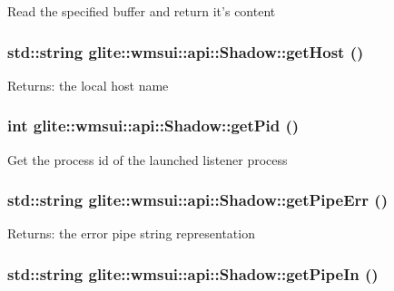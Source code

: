 Read the specified buffer and return it's content \hypertarget{classglite_1_1wmsui_1_1api_1_1Shadow_e0}{
\subsubsection[getHost]{\setlength{\rightskip}{0pt plus 5cm}std::string glite::wmsui::api::Shadow::get\-Host ()}}
\label{classglite_1_1wmsui_1_1api_1_1Shadow_e0}


\begin{Desc}
\item[Returns:]the local host name \end{Desc}
\hypertarget{classglite_1_1wmsui_1_1api_1_1Shadow_a8}{
\subsubsection[getPid]{\setlength{\rightskip}{0pt plus 5cm}int glite::wmsui::api::Shadow::get\-Pid ()}}
\label{classglite_1_1wmsui_1_1api_1_1Shadow_a8}


Get the process id of the launched listener process \hypertarget{classglite_1_1wmsui_1_1api_1_1Shadow_a4}{
\subsubsection[getPipeErr]{\setlength{\rightskip}{0pt plus 5cm}std::string glite::wmsui::api::Shadow::get\-Pipe\-Err ()}}
\label{classglite_1_1wmsui_1_1api_1_1Shadow_a4}


\begin{Desc}
\item[Returns:]the error pipe string representation \end{Desc}
\hypertarget{classglite_1_1wmsui_1_1api_1_1Shadow_a5}{
\subsubsection[getPipeIn]{\setlength{\rightskip}{0pt plus 5cm}std::string glite::wmsui::api::Shadow::get\-Pipe\-In ()}}
\label{classglite_1_1wmsui_1_1api_1_1Shadow_a5}


